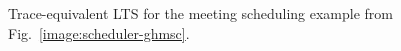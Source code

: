 \begin{figure}
\centering
{}
\caption[Trace-equivalent LTS for the meeting scheduling example]{Trace-equivalent LTS for the meeting scheduling example from Fig.~\ref{image:scheduler-ghmsc}.\label{image:scheduler-lts}}
\end{figure}

